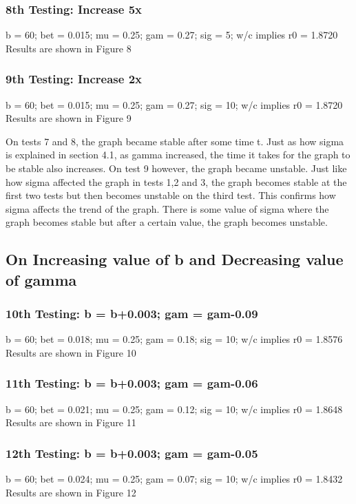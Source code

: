\documentclass{acm_proc_article-sp}
\begin{document}
\subsubsection{8th Testing: Increase 5x}
b = 60; bet = 0.015; mu = 0.25; gam = 0.27; sig = 5; w/c implies r0 = 1.8720\\
Results are shown in Figure 8

\subsubsection{9th Testing: Increase 2x}
b = 60; bet = 0.015; mu = 0.25; gam = 0.27; sig = 10; w/c implies r0 = 1.8720\\
Results are shown in Figure 9

On tests 7 and 8, the graph became stable after some time t. Just as how sigma is explained in section 4.1, as gamma increased, the time it takes for the graph to be stable also increases. On test 9 however, the graph became unstable. Just like how sigma affected the graph in tests 1,2 and 3, the graph becomes stable at the first two tests but then becomes unstable on the third test. This confirms how sigma affects the trend of the graph. There is some value of sigma where the graph becomes stable but after a certain value, the graph becomes unstable.

\subsection{On Increasing value of b and Decreasing value of gamma}

\subsubsection{10th Testing: b = b+0.003; gam = gam-0.09}
b = 60; bet = 0.018; mu = 0.25; gam = 0.18; sig = 10; w/c implies r0 = 1.8576\\
Results are shown in Figure 10

\subsubsection{11th Testing: b = b+0.003; gam = gam-0.06}
b = 60; bet = 0.021; mu = 0.25; gam = 0.12; sig = 10; w/c implies r0 = 1.8648\\
Results are shown in Figure 11

\subsubsection{12th Testing: b = b+0.003; gam = gam-0.05}
b = 60; bet = 0.024; mu = 0.25; gam = 0.07; sig = 10; w/c implies r0 = 1.8432\\
Results are shown in Figure 12
\end{document}
